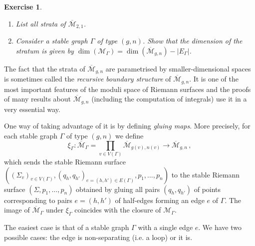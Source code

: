 \documentclass[11pt,reqno]{amsart}
\numberwithin{equation}{section}
\newcommand{\mc}[1]{\mathcal{#1}}
\newcommand{\M}{\mc{M}}
\newcommand{\Mbar}{\overline{\M}}
\theoremstyle{plain}
\newtheorem{exercise}{Exercise}[section]
\theoremstyle{definition}
\begin{document}
\noindent 

\begin{exercise}\leavevmode
  \begin{enumerate}
    \item
    List all strata of $\Mbar_{2,1}$.

    \item
    Consider a stable graph $\Gamma$ of type $(g,n)$. Show that the dimension of the stratum is given by $\dim(\M_{\Gamma}) = \dim(\Mbar_{g,n}) - |E_{\Gamma}|$.

  \end{enumerate}
\end{exercise}

The fact that the strata of $\Mbar_{g,n}$ are parametrised by smaller-dimensional spaces \smash{$\M_{\Gamma}$} is sometimes called the \emph{recursive boundary structure} of $\Mbar_{g,n}$. It is one of the most important features of the moduli space of Riemann surfaces and the proofs of many results about $\Mbar_{g,n}$ (including the computation of integrals) use it in a very essential way.

One way of taking advantage of it is by defining \emph{gluing maps}. More precisely, for each stable graph $\Gamma$ of type $(g,n)$ we define
\begin{equation}
  \xi_{\Gamma} \colon
  \Mbar_{\Gamma} = \prod_{v \in V(\Gamma)} \Mbar_{g(v),n(v)}
  \longrightarrow
  \Mbar_{g,n} \,,
\end{equation}
which sends the stable Riemann surface $((\Sigma_v)_{v \in V(\Gamma)}, (q_{h},q_{h'})_{e=(h,h') \in E(\Gamma)}, p_1,\dots,p_n)$ to the stable Riemann surface $(\Sigma,p_1,\dots,p_n)$ obtained by gluing all pairs $(q_h,q_{h'})$ of points corresponding to pairs $e = (h, h')$ of half-edges forming an edge $e$ of $\Gamma$. The image of $\Mbar_{\Gamma}$ under $\xi_{\Gamma}$ coincides with the closure of $\M_{\Gamma}$.

The easiest case is that of a stable graph $\Gamma$ with a single edge $e$. We have two possible cases: the edge is non-separating (i.e. a loop) or it is.
\end{document}
